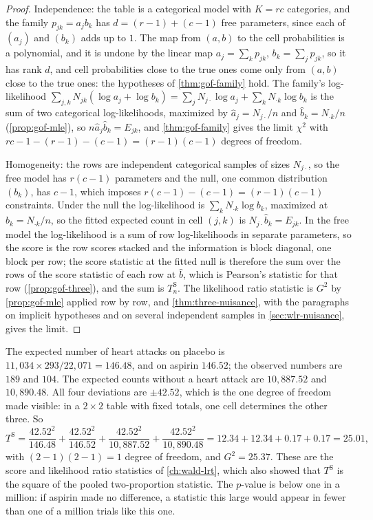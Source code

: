 \begin{proof}
Independence: the table is a categorical model with $K = rc$ categories, and the family $p_{jk} = a_jb_k$ has $d = (r - 1) + (c - 1)$ free parameters, since each of $(a_j)$ and $(b_k)$ adds up to $1$.
The map from $(a, b)$ to the cell probabilities is a polynomial, and it is undone by the linear map $a_j = \sum_kp_{jk}$, $b_k = \sum_jp_{jk}$, so it has rank $d$, and cell probabilities close to the true ones come only from $(a, b)$ close to the true ones: the hypotheses of \cref{thm:gof-family} hold.
The family's log-likelihood $\sum_{j,k}N_{jk}(\log a_j + \log b_k) = \sum_jN_{j\cdot}\log a_j + \sum_kN_{\cdot k}\log b_k$ is the sum of two categorical log-likelihoods, maximized by $\hat{a}_j = N_{j\cdot}/n$ and $\hat{b}_k = N_{\cdot k}/n$ (\cref{prop:gof-mle}), so $n\hat{a}_j\hat{b}_k = E_{jk}$, and \cref{thm:gof-family} gives the limit $\chi^2$ with $rc - 1 - (r - 1) - (c - 1) = (r - 1)(c - 1)$ degrees of freedom.

Homogeneity: the rows are independent categorical samples of sizes $N_{j\cdot}$, so the free model has $r(c - 1)$ parameters and the null, one common distribution $(b_k)$, has $c - 1$, which imposes $r(c - 1) - (c - 1) = (r - 1)(c - 1)$ constraints.
Under the null the log-likelihood is $\sum_kN_{\cdot k}\log b_k$, maximized at $\hat{b}_k = N_{\cdot k}/n$, so the fitted expected count in cell $(j, k)$ is $N_{j\cdot}\hat{b}_k = E_{jk}$.
In the free model the log-likelihood is a sum of row log-likelihoods in separate parameters, so the score is the row scores stacked and the information is block diagonal, one block per row; the score statistic at the fitted null is therefore the sum over the rows of the score statistic of each row at $\hat{b}$, which is Pearson's statistic for that row (\cref{prop:gof-three}), and the sum is $T^{\mathrm{S}}_n$.
The likelihood ratio statistic is $G^2$ by \cref{prop:gof-mle} applied row by row, and \cref{thm:three-nuisance}, with the paragraphs on implicit hypotheses and on several independent samples in \cref{sec:wlr-nuisance}, gives the limit.
\end{proof}

\begin{worked}
The expected number of heart attacks on placebo is $11{,}034 \times 293/22{,}071 = 146.48$, and on aspirin $146.52$; the observed numbers are $189$ and $104$.
The expected counts without a heart attack are $10{,}887.52$ and $10{,}890.48$.
All four deviations are $\pm 42.52$, which is the one degree of freedom made visible: in a $2 \times 2$ table with fixed totals, one cell determines the other three.
So
\[
T^{\mathrm{S}} = \frac{42.52^2}{146.48} + \frac{42.52^2}{146.52} + \frac{42.52^2}{10{,}887.52} + \frac{42.52^2}{10{,}890.48} = 12.34 + 12.34 + 0.17 + 0.17 = 25.01,
\]
with $(2 - 1)(2 - 1) = 1$ degree of freedom, and $G^2 = 25.37$.
These are the score and likelihood ratio statistics of \cref{ch:wald-lrt}, which also showed that $T^{\mathrm{S}}$ is the square of the pooled two-proportion statistic.
The $p$-value is below one in a million: if aspirin made no difference, a statistic this large would appear in fewer than one of a million trials like this one.
\end{worked}

